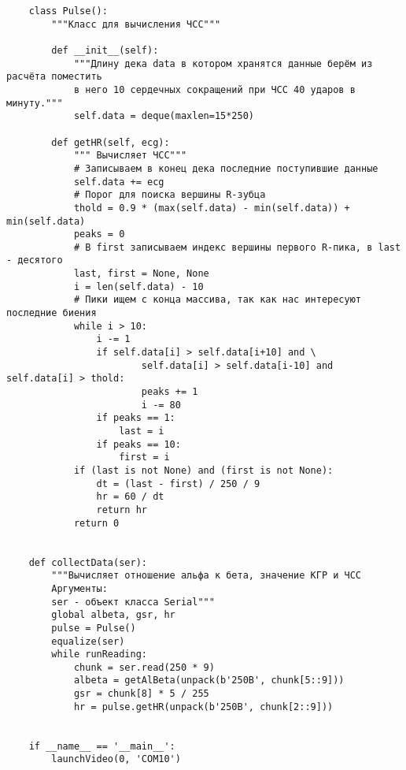 \begin{verbatim}
    class Pulse():
        """Класс для вычисления ЧСС"""

        def __init__(self):
            """Длину дека data в котором хранятся данные берём из расчёта поместить
            в него 10 сердечных сокращений при ЧСС 40 ударов в минуту."""
            self.data = deque(maxlen=15*250)

        def getHR(self, ecg):
            """ Вычисляет ЧСС"""
            # Записываем в конец дека последние поступившие данные
            self.data += ecg
            # Порог для поиска вершины R-зубца
            thold = 0.9 * (max(self.data) - min(self.data)) + min(self.data)
            peaks = 0
            # В first записываем индекс вершины первого R-пика, в last - десятого
            last, first = None, None
            i = len(self.data) - 10
            # Пики ищем с конца массива, так как нас интересуют последние биения
            while i > 10:
                i -= 1
                if self.data[i] > self.data[i+10] and \
                        self.data[i] > self.data[i-10] and self.data[i] > thold:
                        peaks += 1
                        i -= 80
                if peaks == 1:
                    last = i
                if peaks == 10:
                    first = i
            if (last is not None) and (first is not None):
                dt = (last - first) / 250 / 9
                hr = 60 / dt
                return hr
            return 0


    def collectData(ser):
        """Вычисляет отношение альфа к бета, значение КГР и ЧСС
        Аргументы:
        ser - объект класса Serial"""
        global albeta, gsr, hr
        pulse = Pulse()
        equalize(ser)
        while runReading:
            chunk = ser.read(250 * 9)
            albeta = getAlBeta(unpack(b'250B', chunk[5::9]))
            gsr = chunk[8] * 5 / 255
            hr = pulse.getHR(unpack(b'250B', chunk[2::9]))


    if __name__ == '__main__':
        launchVideo(0, 'COM10')

\end{verbatim}


